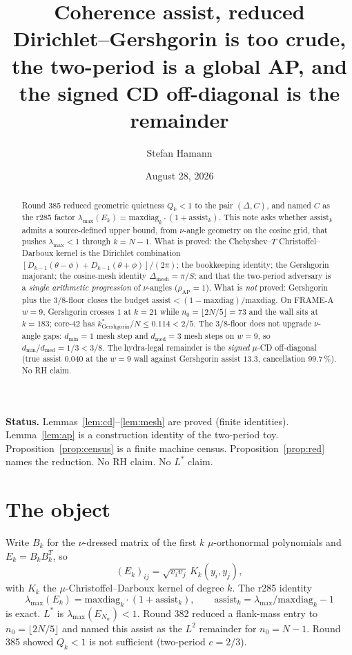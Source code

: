 \documentclass[11pt]{article}
\title{\bfseries Coherence assist, reduced\\[2mm]
\large Dirichlet--Gershgorin is too crude, the two-period is a
global AP, and the signed CD off-diagonal is the remainder}
\author{Stefan Hamann}
\date{August 28, 2026}
\theoremstyle{remark}
\begin{document}
\maketitle

\begin{abstract}\noindent
Round 385 reduced geometric quietness $Q_k<1$ to the pair
$(\Delta,C)$, and named $C$ as the r285 factor
$\lambda_{\max}(E_k)=\mathrm{maxdiag}_k\cdot(1+\mathrm{assist}_k)$.
This note asks whether $\mathrm{assist}_k$ admits a source-defined
upper bound, from $\nu$-angle geometry on the cosine grid, that
pushes $\lambda_{\max}<1$ through $k=N-1$.
What is proved: the Chebyshev--$T$ Christoffel--Darboux kernel is
the Dirichlet combination
$[D_{k-1}(\theta-\phi)+D_{k-1}(\theta+\phi)]/(2\pi)$;
the bookkeeping identity; the Gershgorin majorant;
the cosine-mesh identity $\Delta_{\mathrm{mesh}}=\pi/S$;
and that the two-period adversary is a \emph{single arithmetic
progression} of $\nu$-angles ($\rho_{\mathrm{AP}}=1$).
What is \emph{not} proved: Gershgorin plus the $3/8$-floor
closes the budget $\mathrm{assist}<(1-\mathrm{maxdiag})/\mathrm{maxdiag}$.
On FRAME-A $w=9$, Gershgorin crosses $1$ at $k=21$ while
$n_0=\lfloor 2N/5\rfloor=73$ and the wall sits at $k=183$;
core-$42$ has $k^*_{\mathrm{Gershgorin}}/N\le 0.114<2/5$.
The $3/8$-floor does not upgrade $\nu$-angle gaps:
$d_{\min}=1$ mesh step and $d_{\mathrm{med}}=3$ mesh steps on
$w=9$, so $d_{\min}/d_{\mathrm{med}}=1/3<3/8$.
The hydra-legal remainder is the \emph{signed} $\mu$-CD
off-diagonal (true assist $0.040$ at the $w=9$ wall against
Gershgorin assist $13.3$, cancellation $99.7\,\%$).
No RH claim.
\end{abstract}

\medskip\noindent
\textbf{Status.}\enspace
Lemmas~\ref{lem:cd}--\ref{lem:mesh} are proved (finite identities).
Lemma~\ref{lem:ap} is a construction identity of the two-period
toy.  Proposition~\ref{prop:census} is a finite machine census.
Proposition~\ref{prop:red} names the reduction.
No RH claim.  No $L^*$ claim.

\section{The object}\label{sec:obj}

Write $B_k$ for the $\nu$-dressed matrix of the first $k$
$\mu$-orthonormal polynomials and $E_k=B_k B_k^T$, so
\begin{equation}\label{eq:E}
(E_k)_{ij}
=
\sqrt{v_i v_j}\,K_k(y_i,y_j),
\end{equation}
with $K_k$ the $\mu$-Christoffel--Darboux kernel of degree $k$.
The r285 identity
\begin{equation}\label{eq:book}
\lambda_{\max}(E_k)
=
\mathrm{maxdiag}_k\cdot(1+\mathrm{assist}_k),
\qquad
\mathrm{assist}_k
=
\lambda_{\max}/\mathrm{maxdiag}_k-1
\end{equation}
is exact.  $L^*$ is $\lambda_{\max}(E_{N_w})<1$.  Round 382
reduced a flank-mass entry to $n_0=\lfloor 2N/5\rfloor$ and named
this assist as the $L^2$ remainder for $n_0=N-1$.  Round 385
showed $Q_k<1$ is not sufficient (two-period $c=2/3$).
\end{document}
